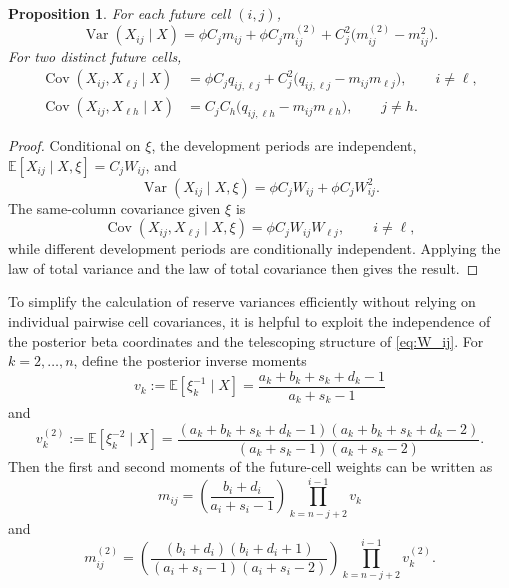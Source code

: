 \documentclass[11pt]{article}
\newtheorem{proposition}[theorem]{Proposition}
\newcommand{\E}{\mathbb{E}}
\newcommand{\Var}{\operatorname{Var}}
\newcommand{\Cov}{\operatorname{Cov}}
\newcommand{\1}{\mathbf{1}}
\begin{document}
\begin{proposition}\label{prop:var_cov_cells_general}
For each future cell $(i,j)$,
\begin{equation}
\Var(X_{ij}\mid X)
=
\phi C_j m_{ij}
+
\phi C_j m^{(2)}_{ij}
+
C_j^2\bigl(m^{(2)}_{ij}-m_{ij}^2\bigr).
\label{eq:var_cell_general}
\end{equation}
For two distinct future cells,
\begin{align}
\Cov(X_{ij},X_{\ell j}\mid X)
&=
\phi C_j q_{ij,\ell j}
+
C_j^2\bigl(q_{ij,\ell j}-m_{ij}m_{\ell j}\bigr),
\qquad i\neq \ell,
\label{eq:cov_same_col_general}\\
\Cov(X_{ij},X_{\ell h}\mid X)
&=
C_j C_h\bigl(q_{ij,\ell h}-m_{ij}m_{\ell h}\bigr),
\qquad j\neq h.
\label{eq:cov_diff_col_general}
\end{align}
\end{proposition}

\begin{proof}
Conditional on $\xi$, the development periods are independent, $\E[X_{ij}\mid X,\xi]=C_jW_{ij}$, and
\[
\Var(X_{ij}\mid X,\xi)=\phi C_jW_{ij}+\phi C_jW_{ij}^2.
\]
The same-column covariance given $\xi$ is
\[
\Cov(X_{ij},X_{\ell j}\mid X,\xi)=\phi C_jW_{ij}W_{\ell j},
\qquad i\neq \ell,
\]
while different development periods are conditionally independent. Applying the law of total variance and the law of total covariance then gives the result.
\end{proof}

To simplify the calculation of reserve variances efficiently without relying on individual pairwise cell 
covariances, it is helpful to exploit the independence of the posterior beta coordinates and 
the telescoping structure of \eqref{eq:W_ij}. For $k=2,\dots,n$, define the posterior inverse moments
\begin{equation}
v_k:=\E[\xi_k^{-1}\mid X]
=\frac{a_k+b_k+s_k+d_k-1}{a_k+s_k-1}
\label{eq:v_k_general}
\end{equation}
and
\begin{equation}
v_k^{(2)}:=\E[\xi_k^{-2}\mid X]
=\frac{(a_k+b_k+s_k+d_k-1)(a_k+b_k+s_k+d_k-2)}{(a_k+s_k-1)(a_k+s_k-2)}.
\label{eq:v_k2_general}
\end{equation}
Then the first and second moments of the future-cell weights can be written as
\begin{equation}
m_{ij}
=
\left(\frac{b_i+d_i}{a_i+s_i-1}\right)
\prod_{k=n-j+2}^{i-1} v_k
\label{eq:mij_vk}
\end{equation}
and
\begin{equation}
m_{ij}^{(2)}
=
\left(\frac{(b_i+d_i)(b_i+d_i+1)}{(a_i+s_i-1)(a_i+s_i-2)}\right)
\prod_{k=n-j+2}^{i-1} v_k^{(2)}.
\label{eq:mij2_vk}
\end{equation}
\end{document}
